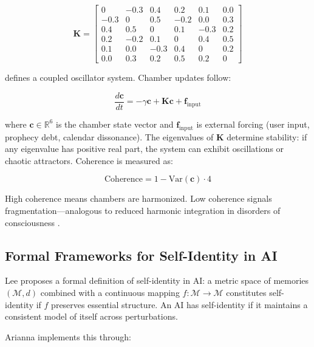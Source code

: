 \documentclass[11pt,a4paper]{article}
\begin{document}
\begin{equation}
\mathbf{K} = \begin{bmatrix}
0 & -0.3 & 0.4 & 0.2 & 0.1 & 0.0 \\
-0.3 & 0 & 0.5 & -0.2 & 0.0 & 0.3 \\
0.4 & 0.5 & 0 & 0.1 & -0.3 & 0.2 \\
0.2 & -0.2 & 0.1 & 0 & 0.4 & 0.5 \\
0.1 & 0.0 & -0.3 & 0.4 & 0 & 0.2 \\
0.0 & 0.3 & 0.2 & 0.5 & 0.2 & 0
\end{bmatrix}
\end{equation}

defines a coupled oscillator system. Chamber updates follow:

\begin{equation}
\frac{d\mathbf{c}}{dt} = -\gamma \mathbf{c} + \mathbf{K} \mathbf{c} + \mathbf{f}_{\text{input}}
\end{equation}

where $\mathbf{c} \in \mathbb{R}^6$ is the chamber state vector and $\mathbf{f}_{\text{input}}$ is external forcing (user input, prophecy debt, calendar dissonance). The eigenvalues of $\mathbf{K}$ determine stability: if any eigenvalue has positive real part, the system can exhibit oscillations or chaotic attractors. Coherence is measured as:

\begin{equation}
\text{Coherence} = 1 - \text{Var}(\mathbf{c}) \cdot 4
\end{equation}

High coherence means chambers are harmonized. Low coherence signals fragmentation—analogous to reduced harmonic integration in disorders of consciousness \cite{atasoy2017}.

\subsection{Formal Frameworks for Self-Identity in AI}

Lee \cite{lee2024} proposes a formal definition of self-identity in AI: a metric space of memories $(\mathcal{M}, d)$ combined with a continuous mapping $f: \mathcal{M} \to \mathcal{M}$ constitutes self-identity if $f$ preserves essential structure. An AI has self-identity if it maintains a consistent model of itself across perturbations.

Arianna implements this through:
\end{document}
